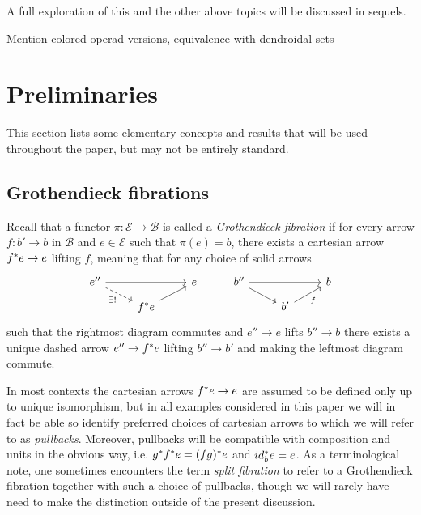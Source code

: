 \documentclass[a4paper,10pt]{article}%
\begin{document}
A full exploration of this and the other above topics will be discussed in sequels.


{\color{red} Mention colored operad versions, equivalence with dendroidal sets}



\section{Preliminaries}
\label{PRELIM_SECTION}

This section lists some elementary concepts
and results that will be used throughout the paper,
but may not be entirely standard.

\subsection{Grothendieck fibrations}
Recall that a functor 
$\pi \colon \mathcal{E} \to \mathcal{B}$
is called a \textit{Grothendieck fibration}
if for every arrow 
$f \colon b' \to b$ in $\mathcal{B}$
and $e \in \mathcal{E}$ such that $\pi(e)=b$,
there exists a cartesian arrow 
$f^{\**} e \to e$ lifting $f$, meaning that for any choice of solid arrows 
\[
\begin{tikzcd}[row sep=7pt]
	e'' \ar{rr} \ar[dashed]{rd}[swap]{\exists !} & & 
	e
&
	b'' \ar{rr} \ar{rd} & & 
	b
\\
	& f^{\**} e \ar{ru} &
&
	& b' \ar{ru}[swap]{f} &
\end{tikzcd}
\]
such that the rightmost diagram commutes and 
$e'' \to e$ lifts $b'' \to b$
there exists a unique dashed arrow
$e'' \to f^{\**} e$ lifting $b'' \to b'$ and making the leftmost diagram commute.

In most contexts the cartesian arrows $f^{\**} e \to e$ are assumed to be defined only up to unique isomorphism, 
but in all examples considered in this paper
we will in fact be able so identify preferred choices of cartesian arrows to which we will refer to as \textit{pullbacks}.
Moreover, pullbacks will be compatible with composition and units in the obvious way, i.e. $g^{\**} f^{\**} e = (fg)^{\**}e$ and $id_b^{\**}e=e$.
As a terminological note, one sometimes encounters the term \textit{split fibration} to refer to a Grothendieck fibration together with such a choice of pullbacks, though we will rarely have need to make the distinction outside of the present discussion. 
\end{document}

